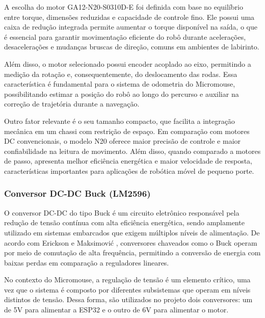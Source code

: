 
A escolha do motor GA12-N20-S0310D-E foi definida com base no equilíbrio entre torque, dimensões reduzidas e capacidade de controle fino. Ele possui uma caixa de redução integrada permite aumentar o torque disponível na saída, o que é essencial para garantir movimentação eficiente do robô durante acelerações, desacelerações e mudanças bruscas de direção, comuns em ambientes de labirinto.

Além disso, o motor selecionado possui encoder acoplado ao eixo, permitindo a medição da rotação e, consequentemente, do deslocamento das rodas. Essa característica é fundamental para o sistema de odometria do Micromouse, possibilitando estimar a posição do robô ao longo do percurso e auxiliar na correção de trajetória durante a navegação.

Outro fator relevante é o seu tamanho compacto, que facilita a integração mecânica em um chassi com restrição de espaço. Em comparação com motores DC convencionais, o modelo N20 oferece maior precisão de controle e maior confiabilidade na leitura de movimento. Além disso, quando comparado a motores de passo, apresenta melhor eficiência energética e maior velocidade de resposta, características importantes para aplicações de robótica móvel de pequeno porte.


\subsubsection{Conversor DC-DC Buck (LM2596)}

O conversor DC-DC do tipo Buck é um circuito eletrônico responsável pela redução de tensão contínua com alta eficiência energética, sendo amplamente utilizado em sistemas embarcados que exigem múltiplos níveis de alimentação. De acordo com Erickson e Maksimović \cite{erickson_power_electronics}, conversores chaveados como o Buck operam por meio de comutação de alta frequência, permitindo a conversão de energia com baixas perdas em comparação a reguladores lineares.

No contexto do Micromouse, a regulação de tensão é um elemento crítico, uma vez que o sistema é composto por diferentes subsistemas que operam em níveis distintos de tensão. Dessa forma, são utilizados no projeto dois conversores: um de 5V para alimentar a ESP32 e o outro de 6V para alimentar o motor.


